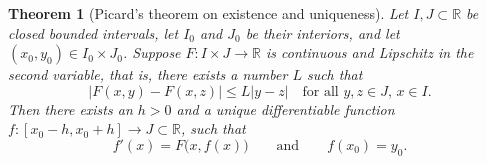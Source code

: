 \documentclass[12pt]{book}
\newcommand{\abs}[1]{\left\lvert {#1} \right\rvert}
\newcommand{\R}{{\mathbb{R}}}
\theoremstyle{plain}
\newtheorem{thm}{Theorem}[section]
\theoremstyle{remark}
\theoremstyle{definition}
\theoremstyle{exercise}
\theoremstyle{example}
\begin{document}
\begin{thm}[Picard's theorem on existence and uniqueness]%
Let $I, J \subset \R$ be closed bounded intervals, 
let $I_0$ and $J_0$ be their interiors, and
let $(x_0,y_0) \in I_0 \times J_0$.
Suppose $F \colon I \times J \to \R$ is continuous
and Lipschitz in the second variable, that is, there exists a number $L$
such that
\begin{equation*}
\abs{F(x,y) - F(x,z)} \leq L \abs{y-z}
\ \ \ \text{ for all $y,z \in J$, $x \in I$} .
\end{equation*}
Then there exists an $h > 0$ and a unique differentiable
function $f \colon [x_0 - h, x_0 + h] \to J \subset \R$, such that
\begin{equation} \label{picard:diffeq}
f'(x) = F\bigl(x,f(x)\bigr) \qquad \text{and} \qquad f(x_0) = y_0.
\end{equation}
\end{thm}
\end{document}
